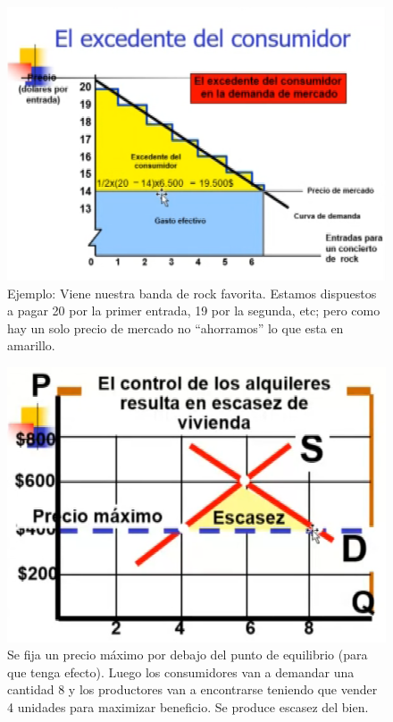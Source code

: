 \documentclass[twocolumn,10pt]{article}
\begin{document}
\begin{figure}[tbh!]
	\centering
	\includegraphics[width=1\linewidth]{fig/excedentConsumidor}
	\caption{Ejemplo: Viene nuestra banda de rock favorita. Estamos dispuestos a pagar 20 por la primer entrada, 19 por la segunda, etc; pero como hay un solo precio de mercado no ``ahorramos'' lo que esta en amarillo.}
	\label{fig:excedentconsumidor}
\end{figure}

\begin{figure}[tbh!]
	\centering
	\includegraphics[width=1\linewidth]{fig/escasezConsumidor}
	\caption{Se fija un precio m\'aximo por debajo del punto de equilibrio (para que tenga efecto). Luego los consumidores van a demandar una cantidad 8 y los productores van a encontrarse teniendo que vender 4 unidades para maximizar beneficio. Se produce escasez del bien.}
	\label{fig:escasezconsumidor}
\end{figure}
\end{document}
